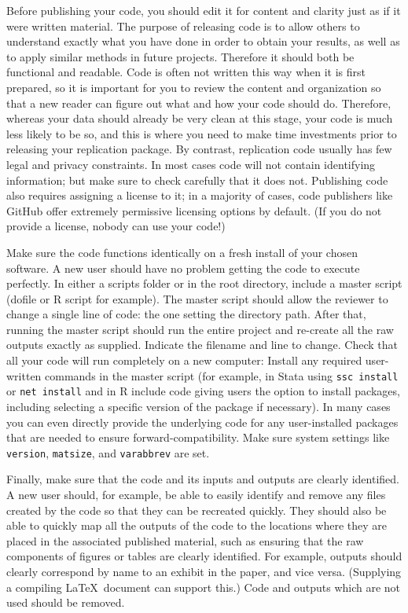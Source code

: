 Before publishing your code, you should edit it for content and clarity
just as if it were written material.
The purpose of releasing code is to allow others to understand
exactly what you have done in order to obtain your results,
as well as to apply similar methods in future projects.
Therefore it should both be functional and readable.
Code is often not written this way when it is first prepared,
so it is important for you to review the content and organization
so that a new reader can figure out what and how your code should do.
Therefore, whereas your data should already be very clean at this stage,
your code is much less likely to be so, and this is where you need to make
time investments prior to releasing your replication package.
By contrast, replication code usually has few legal and privacy constraints.
In most cases code will not contain identifying information;
but make sure to check carefully that it does not.
Publishing code also requires assigning a license to it;
in a majority of cases, code publishers like GitHub
offer extremely permissive licensing options by default.
(If you do not provide a license, nobody can use your code!)

Make sure the code functions identically on a fresh install of your chosen software.
A new user should have no problem getting the code to execute perfectly.
In either a scripts folder or in the root directory,
include a master script (dofile or R script for example).
The master script should allow the reviewer
to change a single line of code: the one setting the directory path.
After that, running the master script should run the entire project
and re-create all the raw outputs exactly as supplied.
Indicate the filename and line to change.
Check that all your code will run completely on a new computer:
Install any required user-written commands in the master script
(for example, in Stata using \texttt{ssc install} or \texttt{net install}
and in R include code giving users the option to install packages,
including selecting a specific version of the package if necessary).
In many cases you can even directly provide the underlying code
for any user-installed packages that are needed to ensure forward-compatibility.
Make sure system settings like \texttt{version}, \texttt{matsize}, and \texttt{varabbrev} are set.

Finally, make sure that the code and its inputs and outputs are clearly identified.
A new user should, for example, be able to easily identify and remove
any files created by the code so that they can be recreated quickly.
They should also be able to quickly map all the outputs of the code
to the locations where they are placed in the associated published material,
such as ensuring that the raw components of figures or tables are clearly identified.
For example, outputs should clearly correspond by name to an exhibit in the paper, and vice versa.
(Supplying a compiling \LaTeX\ document can support this.)
Code and outputs which are not used should be removed.

